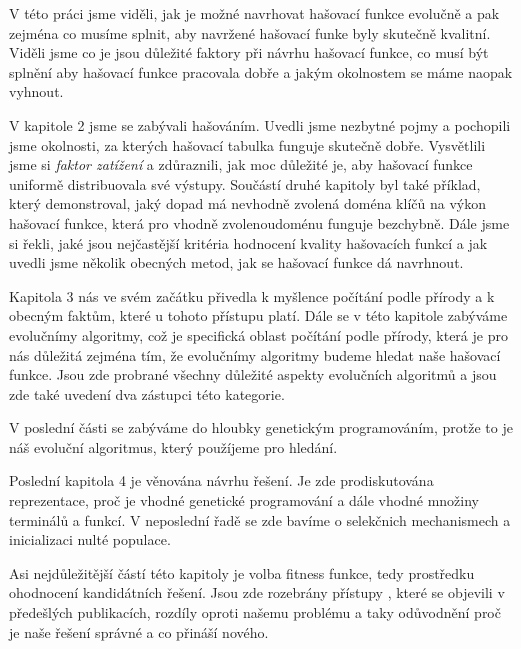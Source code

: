
V této práci jsme viděli, jak je možné navrhovat hašovací funkce evolučně
a pak zejména co musíme splnit, aby navržené hašovací funke byly skutečně
kvalitní. Viděli jsme co je jsou důležité faktory při návrhu hašovací 
funkce, co musí být splnění aby hašovací funkce pracovala dobře a jakým
okolnostem se máme naopak vyhnout.

V kapitole 2 jsme se zabývali hašováním. Uvedli jsme nezbytné pojmy 
a pochopili jsme okolnosti, za kterých hašovací tabulka funguje skutečně
dobře. Vysvětlili jsme si \textit{faktor zatížení} a zdůraznili, jak
moc důležité je, aby hašovací funkce uniformě distribuovala své výstupy.
Součástí druhé kapitoly byl také příklad, který demonstroval, jaký dopad
má nevhodně zvolená doména klíčů na výkon hašovací funkce, která pro 
vhodně zvolenoudoménu funguje bezchybně. Dále jsme si řekli, jaké jsou
nejčastější kritéria hodnocení kvality hašovacích funkcí a jak uvedli
jsme několik obecných metod, jak se hašovací funkce dá navrhnout.

Kapitola 3 nás ve svém začátku přivedla k myšlence počítání podle přírody
a k obecným faktům, které u tohoto přístupu platí. Dále se v této kapitole
zabýváme evolučnímy algoritmy, což je specifická oblast počítání podle
přírody, která je pro nás důležitá zejména tím, že evolučnímy algoritmy
budeme hledat naše hašovací funkce. Jsou zde probrané všechny důležité 
aspekty evolučních algoritmů a jsou zde také uvedení dva zástupci této
kategorie.

V poslední části se zabýváme do hloubky genetickým programováním, protže
to je náš evoluční algoritmus, který použíjeme pro hledání.

Poslední kapitola 4 je věnována návrhu řešení. Je zde prodiskutována 
reprezentace, proč je vhodné genetické programování a dále vhodné množiny
terminálů a funkcí. V neposlední řadě se zde bavíme o selekčnich mechanismech a
inicializaci nulté populace.

Asi nejdůležitější částí této kapitoly je volba fitness funkce, tedy 
prostředku ohodnocení kandidátních řešení. Jsou zde rozebrány přístupy
, které se objevili v předešlých publikacích, rozdíly oproti našemu problému
a taky odůvodnění proč je naše řešení správné a co přináší nového.
